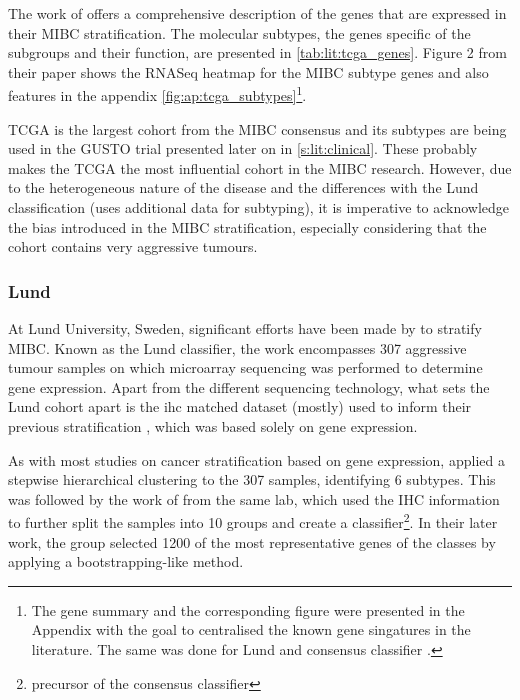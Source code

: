 The work of \citet{Robertson2017-mg} offers a comprehensive description of the genes that are expressed in their MIBC stratification. The molecular subtypes, the genes specific of the subgroups and their function, are presented in \cref{tab:lit:tcga_genes}. Figure 2 from their paper shows the RNASeq heatmap for the MIBC subtype genes and also features in the appendix \cref{fig:ap:tcga_subtypes}\footnote{The gene summary and the corresponding figure were presented in the Appendix with the goal to centralised the known gene singatures in the literature. The same was done for Lund and consensus classifier \citep{Marzouka2018-ge,Kamoun2020-tj}.}.


TCGA is the largest cohort from the MIBC consensus and its subtypes are being used in the GUSTO trial presented later on in \cref{s:lit:clinical}. These probably makes the TCGA the most influential cohort in the MIBC research. However, due to the heterogeneous nature of the disease and the differences with the Lund classification (uses additional data for subtyping), it is imperative to acknowledge the bias introduced in the MIBC stratification, especially considering that the cohort contains very aggressive tumours.

\subsubsection*{Lund} \label{s:lit:lund_mibc}

At Lund University, Sweden, significant efforts have been made by \citep{Sjodahl2017-xr, Marzouka2018-ge} to stratify MIBC. Known as the Lund classifier, the work encompasses 307 aggressive tumour samples on which microarray sequencing was performed to determine gene expression. Apart from the different sequencing technology, what sets the Lund cohort apart is the \acrfull{ihc} matched dataset (mostly) used to inform their previous stratification \citet{Sjodahl2017-xr}, which was based solely on gene expression.

As with most studies on cancer stratification based on gene expression, \citet{Sjodahl2017-xr} applied a stepwise hierarchical clustering to the 307 samples, identifying 6 subtypes. This was followed by the work of \citet{Marzouka2018-ge} from the same lab, which used the IHC information to further split the samples into 10 groups and create a classifier\footnote{precursor of the consensus classifier}. In their later work, the group selected 1200 of the most representative genes of the classes by applying a bootstrapping-like method.

